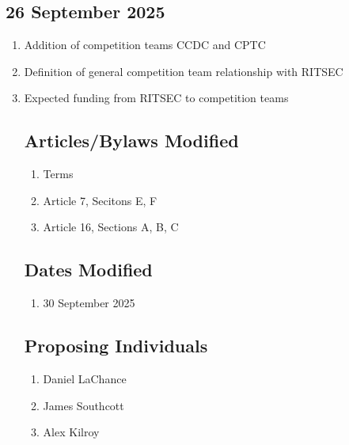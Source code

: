 \subsection{26 September 2025}
\begin{enumerate}
      \item Addition of competition teams CCDC and CPTC
      \item Definition of general competition team relationship with RITSEC
      \item Expected funding from RITSEC to competition teams

            \subsection{Articles/Bylaws Modified}
            \begin{enumerate}
                  \item Terms
                  \item Article 7, Secitons E, F
                  \item Article 16, Sections A, B, C
            \end{enumerate}

            \subsection{Dates Modified}
            \begin{enumerate}
                  \item 30 September 2025
            \end{enumerate}

            \subsection{Proposing Individuals}
            \begin{enumerate}
                  \item Daniel LaChance
                  \item James Southcott
                  \item Alex Kilroy
            \end{enumerate}
\end{enumerate}